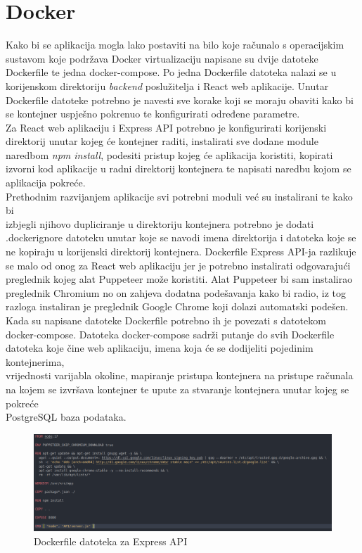 \documentclass[times, utf8, zavrsni]{fer}
\begin{document}
\section{Docker}
Kako bi se aplikacija mogla lako postaviti na bilo koje računalo s operacijskim \\sustavom koje podržava Docker virtualizaciju napisane su 
dvije datoteke Dockerfile te jedna docker-compose. Po jedna Dockerfile datoteka nalazi se u korijenskom direktoriju \emph{backend} poslužitelja i 
React web aplikacije. Unutar Dockerfile datoteke potrebno je navesti sve korake koji se moraju obaviti kako bi se kontejner uspješno pokrenuo te konfigurirati
određene parametre.
\\Za React web aplikaciju i Express API potrebno je konfigurirati korijenski direktorij unutar kojeg će kontejner raditi, instalirati sve dodane module naredbom \emph{npm install}, 
podesiti pristup  kojeg će aplikacija koristiti, kopirati izvorni kod aplikacije u radni direktorij kontejnera te napisati naredbu kojom se 
aplikacija pokreće. \\Prethodnim razvijanjem aplikacije svi potrebni moduli već su instalirani te kako bi \\izbjegli njihovo dupliciranje u direktoriju kontejnera potrebno je dodati 
.dockerignore datoteku unutar koje se navodi imena direktorija i datoteka koje se ne kopiraju u korijenski direktorij kontejnera.
Dockerfile Express API-ja razlikuje se malo od onog za React web aplikaciju jer je potrebno instalirati odgovarajući preglednik kojeg alat Puppeteer može koristiti.
Alat Puppeteer bi sam instalirao preglednik Chromium no on zahjeva dodatna podešavanja kako bi radio, iz tog razloga instaliran je preglednik Google Chrome koji 
dolazi automatski podešen.
\\Kada su napisane datoteke Dockerfile potrebno ih je povezati s datotekom \\docker-compose. Datoteka docker-compose sadrži putanje do svih Dockerfile datoteka koje 
čine web aplikaciju, imena koja će se dodijeliti pojedinim kontejnerima, \\vrijednosti varijabla okoline, mapiranje pristupa kontejnera na pristupe računala na kojem se izvršava kontejner te
upute za stvaranje kontejnera unutar kojeg se pokreće \\PostgreSQL baza podataka.
\begin{figure}[htb]
    \hspace*{-2cm}
       \includegraphics[scale=0.33]{dockerfile.png} 
       \caption{Dockerfile datoteka za Express API}
       \label{fig:docker1}
       \end{figure}
\end{document}
